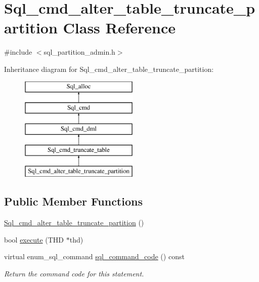 \hypertarget{classSql__cmd__alter__table__truncate__partition}{}\section{Sql\+\_\+cmd\+\_\+alter\+\_\+table\+\_\+truncate\+\_\+partition Class Reference}
\label{classSql__cmd__alter__table__truncate__partition}


{\ttfamily \#include $<$sql\+\_\+partition\+\_\+admin.\+h$>$}

Inheritance diagram for Sql\+\_\+cmd\+\_\+alter\+\_\+table\+\_\+truncate\+\_\+partition\+:\begin{figure}[H]
\begin{center}
\leavevmode
\includegraphics[height=5.000000cm]{classSql__cmd__alter__table__truncate__partition}
\end{center}
\end{figure}
\subsection*{Public Member Functions}
\begin{DoxyCompactItemize}
\item 
\mbox{\hyperlink{classSql__cmd__alter__table__truncate__partition_af6a3c6beeddc06bcee29c28bfa7a1e84}{Sql\+\_\+cmd\+\_\+alter\+\_\+table\+\_\+truncate\+\_\+partition}} ()
\item 
bool \mbox{\hyperlink{classSql__cmd__alter__table__truncate__partition_a00d67d3b9cc8ab79100cbc74ec89702c}{execute}} (T\+HD $\ast$thd)
\item 
\mbox{\label{classSql__cmd__alter__table__truncate__partition_aa4fdd45e855fe54f423a7ceaecc323cb}} 
virtual enum\+\_\+sql\+\_\+command \mbox{\hyperlink{classSql__cmd__alter__table__truncate__partition_aa4fdd45e855fe54f423a7ceaecc323cb}{sql\+\_\+command\+\_\+code}} () const
\begin{DoxyCompactList}\small\item\em Return the command code for this statement. \end{DoxyCompactList}\end{DoxyCompactItemize}
